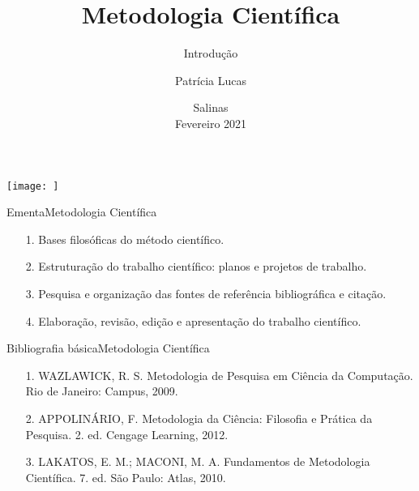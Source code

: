 \documentclass[t]{beamer}
\title[]{Metodologia Científica}
\subtitle[]{Introdução}
\author[]{Patrícia Lucas\\{\footnotesize }}
\institute{Bacharelado em Sistemas de Informação \\ IFNMG  - Campus Salinas}
\date{\scriptsize Salinas\\Fevereiro 2021}
\begin{document}
\begin{frame}

\begin{center}
\texttt{[image: ]}
\end{center}
  \titlepage
\end{frame}

\begin{ftst}{Ementa}{Metodologia Científica}
\vone
\vone
\begin{itemize}
    \item[1.] Bases filosóficas do método científico. 
    \item[2.] Estruturação do trabalho científico: planos e projetos de trabalho. 
    \item[3.] Pesquisa e organização das fontes de referência bibliográfica e citação. 
    \item[4.] Elaboração, revisão, edição e apresentação do trabalho científico.
\end{itemize}

\end{ftst}


\begin{ftst}{Bibliografia básica}{Metodologia Científica}
\vone
\vone
\begin{itemize}
    \item[1.] WAZLAWICK, R. S. Metodologia de Pesquisa em Ciência da Computação. Rio de Janeiro: Campus, 2009.
    \item[2.] APPOLINÁRIO, F. Metodologia da Ciência: Filosofia e Prática da Pesquisa. 2. ed. Cengage Learning, 2012.
    \item[3.] LAKATOS, E. M.; MACONI, M. A. Fundamentos de Metodologia Científica. 7. ed. São Paulo: Atlas, 2010.
\end{itemize}

\end{ftst}
\end{document}
